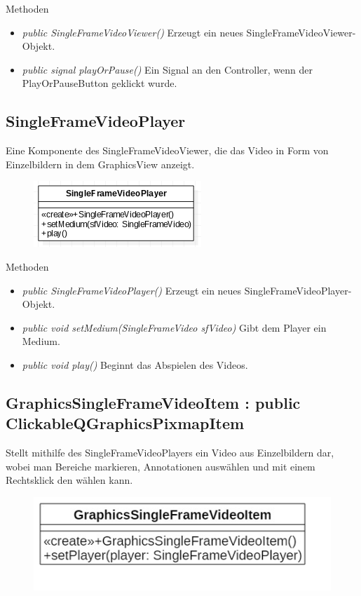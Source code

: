 Methoden
\begin{itemize}
	\item\textit{public SingleFrameVideoViewer()} 
	Erzeugt ein neues SingleFrameVideoViewer-Objekt.
	\item\textit{public signal playOrPause()} 
	Ein Signal an den Controller, wenn der PlayOrPauseButton geklickt wurde.
\end{itemize} 

\subsection*{SingleFrameVideoPlayer} 
Eine Komponente des SingleFrameVideoViewer, die das Video in Form von Einzelbildern in dem GraphicsView anzeigt.

\begin{figure}[H]
	\centering
	\includegraphics[scale=0.5]{img/Klassendiagramm/Klassen/View/SingleFrameVideoPlayer}
	\label{fig:singleFrameVideoPlayer}
\end{figure}

Methoden
\begin{itemize}
	\item\textit{public SingleFrameVideoPlayer()} 
	Erzeugt ein neues SingleFrameVideoPlayer-Objekt.
	\item\textit{public void setMedium(SingleFrameVideo sfVideo)} 
	Gibt dem Player ein Medium.
	\item\textit{public void play()} 
	Beginnt das Abspielen des Videos.
\end{itemize}

\subsection*{GraphicsSingleFrameVideoItem : public ClickableQGraphicsPixmapItem}
Stellt mithilfe des SingleFrameVideoPlayers ein Video aus Einzelbildern dar, wobei man Bereiche markieren, Annotationen auswählen und mit einem Rechtsklick den  wählen kann.

\begin{figure}[H]
	\centering
	\includegraphics[scale=0.5]{img/Klassendiagramm/Klassen/View/GraphicsSingleFrameVideoItem}
	\label{fig:graphicsSingleFrameVideoItem}
\end{figure}

